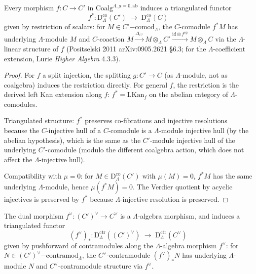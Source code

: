 \begin{proposition}
\label{v4-arith:pos-costello:prop:induced-pullback}
Every morphism
\(f\colon C\to C'\) in
\(\mathrm{Coalg}^{\Lambda,\mu=0,\mathrm{ab}}\) induces a
triangulated functor
\begin{equation}
f^{*}\colon\mathrm{D}^{\mathrm{co}}_{\Lambda}(C')\;\to\;\mathrm{D}^{\mathrm{co}}_{\Lambda}(C)
\end{equation}
given by restriction of scalars: for
\(M\in C'\mathrm{-comod}_{\Lambda}\), the \(C\)-comodule \(f^{*}M\)
has underlying \(\Lambda\)-module \(M\) and \(C\)-coaction
\(M\xrightarrow{\Delta_{C'}}M\otimes_{\Lambda}C'\xrightarrow{\mathrm{id}\otimes f^{\mathrm{op}}}M\otimes_{\Lambda}C\)
via the \(\Lambda\)-linear structure of \(f\)
(Positselski 2011 arXiv:0905.2621 \S6.3; for the
\(\Lambda\)-coefficient extension, Lurie \emph{Higher Algebra}
4.3.3).
\end{proposition}

\begin{proof}
For \(f\) a split injection, the splitting \(g\colon C'\to C\) (as
\(\Lambda\)-module, not as coalgebra) induces the restriction
directly. For general \(f\), the restriction is the derived
left Kan extension along \(f\): \(f^{*}=\mathrm{LKan}_{f}\) on the
abelian category of \(\Lambda\)-comodules.

Triangulated structure: \(f^{*}\) preserves co-fibrations and
injective resolutions because the \(C\)-injective hull of a
\(C\)-comodule is a \(\Lambda\)-module injective hull (by the abelian
hypothesis), which is the same as the \(C'\)-module injective hull
of the underlying \(C'\)-comodule (modulo the different coalgebra
action, which does not affect the \(\Lambda\)-injective hull).

Compatibility with \(\mu=0\): for
\(M\in\mathrm{D}^{\mathrm{co}}_{\Lambda}(C')\) with
\(\mu(M)=0\), \(f^{*}M\) has the same underlying \(\Lambda\)-module,
hence \(\mu(f^{*}M)=0\). The Verdier quotient by acyclic
injectives is preserved by \(f^{*}\) because \(\Lambda\)-injective
resolution is preserved.
\end{proof}

\begin{proposition}
\label{v4-arith:pos-costello:prop:induced-pushforward}
The dual morphism \(f^{\vee}\colon (C')^{\vee}\to C^{\vee}\)
is a \(\Lambda\)-algebra morphism, and induces a triangulated
functor
\begin{equation}
(f^{\vee})_{*}\colon\mathrm{D}^{\mathrm{ctr}}_{\Lambda}((C')^{\vee})\;\to\;\mathrm{D}^{\mathrm{ctr}}_{\Lambda}(C^{\vee})
\end{equation}
given by pushforward of contramodules along the \(\Lambda\)-algebra
morphism \(f^{\vee}\): for \(N\in (C')^{\vee}\mathrm{-contramod}_{\Lambda}\),
the \(C^{\vee}\)-contramodule \((f^{\vee})_{*}N\) has underlying
\(\Lambda\)-module \(N\) and \(C^{\vee}\)-contramodule structure via
\(f^{\vee}\).
\end{proposition}

